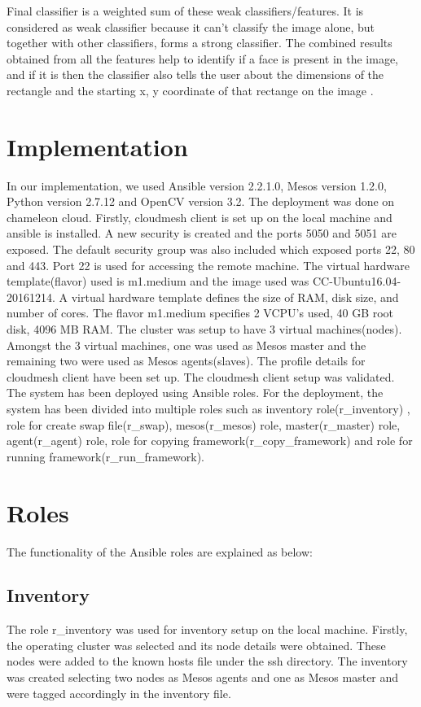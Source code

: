 \documentclass[9pt,twocolumn,twoside]{../../styles/osajnl}
\begin{document}
Final classifier is a weighted sum of these weak
classifiers/features. It is considered as weak classifier because it
can't classify the image alone, but together with other classifiers,
forms a strong classifier. The combined results obtained from all the
features help to identify if a face is present in the image, and if it
is then the classifier also tells the user about the dimensions of the
rectangle and the starting x, y coordinate of that rectange on the
image \cite{www-adaboost-wiki}.

\section{Implementation}
In our implementation, we used Ansible version 2.2.1.0, Mesos version
1.2.0, Python version 2.7.12 and OpenCV version 3.2. The deployment
was done on chameleon cloud.  Firstly, cloudmesh client is set up on
the local machine and ansible is installed. A new security is created
and the ports 5050 and 5051 are exposed. The default security group
was also included which exposed ports 22, 80 and 443. Port 22 is used
for accessing the remote machine. The virtual hardware
template(flavor) used is m1.medium and the image used was
CC-Ubuntu16.04-20161214. A virtual hardware template defines the size
of RAM, disk size, and number of cores. The flavor m1.medium specifies
2 VCPU's used, 40 GB root disk, 4096 MB RAM. The cluster was setup to
have 3 virtual machines(nodes). Amongst the 3 virtual machines, one was
used as Mesos master and the remaining two were used as Mesos
agents(slaves).  The profile details for cloudmesh client have been set
up. The cloudmesh client setup was validated. The system has been
deployed using Ansible roles. For the deployment, the system has been
divided into multiple roles such as inventory role(r\_inventory) ,
role for create swap file(r\_swap), mesos(r\_mesos) role,
master(r\_master) role, agent(r\_agent) role, role for copying
framework(r\_copy\_framework) and role for running
framework(r\_run\_framework).

\section{Roles}
The functionality of the Ansible roles are explained as below:

\subsection{Inventory}
The role r\_inventory was used for inventory setup on the local
machine.  Firstly, the operating cluster was selected and its node
details were obtained. These nodes were added to the known hosts file
under the ssh directory. The inventory was created selecting two nodes
as Mesos agents and one as Mesos master and were tagged accordingly in
the inventory file.
\end{document}
